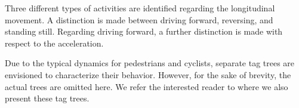 \documentclass[twoside,twocolumn,9pt]{extarticle}
\theoremstyle{plain}
\begin{document}
Three different types of activities are identified regarding the longitudinal movement. A distinction is made between driving forward, reversing, and standing still. Regarding driving forward, a further distinction is made with respect to the acceleration.

Due to the typical dynamics for pedestrians and cyclists, separate tag trees are envisioned to characterize their behavior. However, for the sake of brevity, the actual trees are omitted here. We refer the interested reader to \autocite{degelder2019scenariocategories} where we also present these tag trees.
%
%
%
\end{document}
